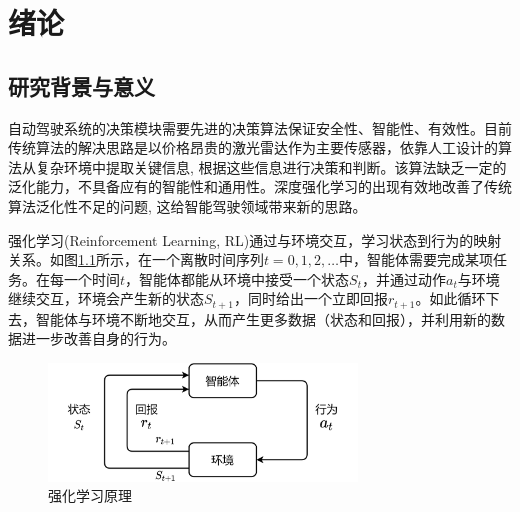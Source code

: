 %
%
%
%
%
%

\chapter{绪论} %

\section{研究背景与意义}\label{1.1研究背景与意义} %

自动驾驶系统的决策模块需要先进的决策算法保证安全性、智能性、有效性。目前传统算法的解决思路是以价格昂贵的激光雷达作为主要传感器，依靠人工设计的算法从复杂环境中提取关键信息, 根据这些信息进行决策和判断。该算法缺乏一定的泛化能力，不具备应有的智能性和通用性。深度强化学习的出现有效地改善了传统算法泛化性不足的问题, 这给智能驾驶领域带来新的思路。

强化学习(Reinforcement Learning, RL)通过与环境交互，学习状态到行为的映射关系。如图\ref{强化学习原理}所示，在一个离散时间序列$t=0,1,2,… $中，智能体需要完成某项任务。在每一个时间$t$，智能体都能从环境中接受一个状态$S_t$，并通过动作$a_t$与环境继续交互，环境会产生新的状态$S_{t+1}$，同时给出一个立即回报$r_{t+1}$。如此循环下去，智能体与环境不断地交互，从而产生更多数据（状态和回报），并利用新的数据进一步改善自身的行为。

\begin{figure}[htbp]
  \vspace{13pt} %
  \centering
  \includegraphics[width=0.73\textwidth]{images/chapter1/RL_structure.png}
  \caption{强化学习原理}\label{强化学习原理} %
\end{figure}


